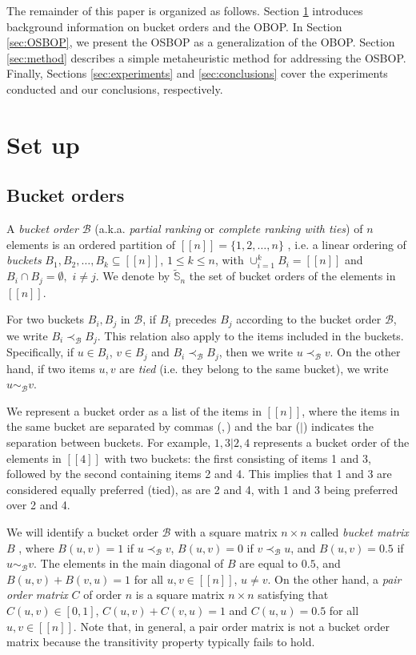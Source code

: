\documentclass[preprint,12pt]{article}
\theoremstyle{definition}
\theoremstyle{remark}
\theoremstyle{example} %
\begin{document}
The remainder of this paper is organized as follows. Section \ref{sec:set-up} introduces background information on bucket orders and the OBOP. In Section \ref{sec:OSBOP}, we present the OSBOP as a generalization of the OBOP. Section \ref{sec:method} describes a simple metaheuristic method for addressing the OSBOP. Finally, Sections \ref{sec:experiments} and \ref{sec:conclusions} cover the experiments conducted and our conclusions, respectively.

\bigskip




\section{Set up}\label{sec:set-up}
\subsection{Bucket orders}
A  \emph{bucket order} $\mathcal{B}$ (a.k.a. \emph{partial ranking} or \emph{complete ranking with ties}) of $n$ elements is an ordered partition of $[[n]]=\{1,2,\dots,n\}$ \cite{Fagin2004,Gionis2006,Ukkonen2009}, i.e. a linear ordering of \emph{buckets} $B_1,B_2,\dots,B_k\subseteq[[n]]$, $1\leq k\leq n$, with $\cup_{i=1}^k B_i=[[n]]$ and $B_i \cap B_j = \emptyset,$ $i\neq j$. We denote by $\widetilde{\mathbb{S}}_n$ the set of bucket orders of the elements in $[[n]]$.

For two buckets $B_i, B_j$ in $\mathcal{B}$, if $B_i$ precedes $B_j$ according to the bucket order $\mathcal{B}$, we write $B_i\prec_\mathcal{B} B_j$. This relation also apply to the items included in the buckets. Specifically, if $u \in B_i$, $v \in B_j$ and  $B_i\prec_\mathcal{B} B_j$, then we write $u\prec_\mathcal{B} v$. On the other hand, if two items $u,v$ are \emph{tied} (i.e. they belong to the same bucket), we write $u \sim_{\mathcal{B}} v$.
   
 We represent a bucket order as a list of the items in $[[n]]$, where the items in the same bucket are separated by commas ($,$) and the bar ($|$)  indicates the separation between buckets. For example,  $1,3|2,4$ represents a bucket order of the elements in $[[4]]$ with two buckets: the first consisting of items 1 and 3, followed by the second containing items 2 and 4. This implies that 1 and 3 are considered equally preferred (tied), as are 2 and 4, with 1 and 3 being preferred over 2 and 4.

We will identify  a bucket order $\mathcal{B}$ with a square matrix $n\times n$ called \emph{bucket matrix} $B$ \cite{Gionis2006,Ukkonen2009}, where $B(u,v)=1$ if $u\prec_\mathcal{B} v$, $B(u,v)=0$ if $v\prec_\mathcal{B} u$, and $B(u,v)=0.5$ if $u \sim_{\mathcal{B}} v$. 
The elements in the main diagonal of $B$ are equal to $0.5$, and $B(u,v)+B(v,u)=1$ for all $u,v\in[[n]]$, $u\neq v$. On the other hand, a \emph{pair order matrix} $C$ of order $n$ is a square matrix $n\times n$ satisfying that $C(u,v)\in [0,1]$, $C(u,v)+C(v,u)=1$ and $C(u,u)=0.5$ for all $u,v\in[[n]]$. Note that, in general, a pair order matrix is not a bucket order matrix because the transitivity property typically fails to hold.
\end{document}
